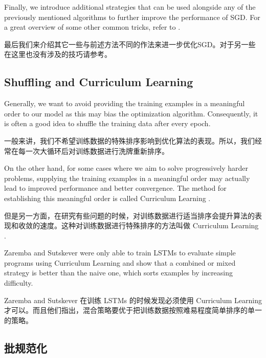 \documentclass{article}
\begin{document}
Finally, we introduce additional strategies that can be used alongside any of the previously mentioned algorithms to further improve the performance of SGD. For a great overview of some other common tricks, refer to \cite{LeCun1998}.

最后我们来介绍其它一些与前述方法不同的作法来进一步优化SGD。对于另一些在这里也没有涉及的技巧请参考\cite{LeCun1998}。

\subsection{Shuffling and Curriculum Learning} \label{sec:shuffling}

Generally, we want to avoid providing the training examples in a meaningful order to our model as this may bias the optimization algorithm. Consequently, it is often a good idea to shuffle the training data after every epoch. 

一般来讲，我们不希望训练数据的特殊排序影响到优化算法的表现。所以，我们经常在每一次大循环后对训练数据进行洗牌重新排序。

On the other hand, for some cases where we aim to solve progressively harder problems, supplying the training examples in a meaningful order may actually lead to improved performance and better convergence. The method for establishing this meaningful order is called Curriculum Learning \cite{Bengio2009a}. 

但是另一方面，在研究有些问题的时候，对训练数据进行适当排序会提升算法的表现和收敛的速度。这种对训练数据进行特殊排序的方法叫做 Curriculum Learning \cite{Bengio2009a}.

Zaremba and Sutskever \cite{Zaremba2014a} were only able to train LSTMs to evaluate simple programs using Curriculum Learning and show that a combined or mixed strategy is better than the naive one, which sorts examples by increasing difficulty.

Zaremba and Sutskever \cite{Zaremba2014a} 在训练 LSTMs 的时候发现必须使用 Curriculum Learning 才可以。而且他们指出，混合策略要优于把训练数据按照难易程度简单排序的单一的策略。

\subsection{批规范化}
\end{document}
